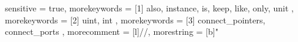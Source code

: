 {
  sensitive = true,
  morekeywords = [1]{
    also,
    instance,
    is,
    keep,
    like,
    only,
    unit
  },
  morekeywords = [2]{
    uint,
    int
  }, 
  morekeywords = [3]{
    connect_pointers,
    connect_ports
  },
  morecomment = [l]{//},
  morestring = [b]"
}